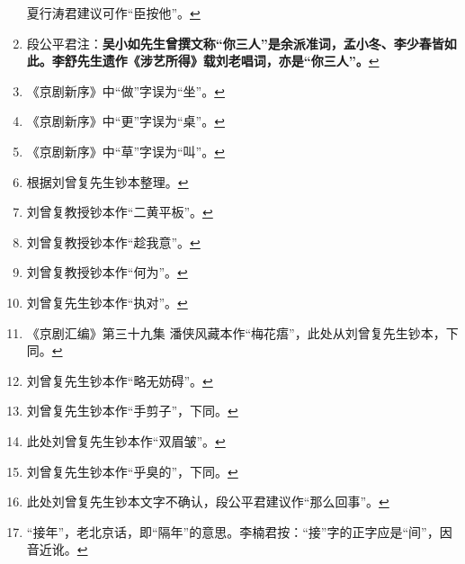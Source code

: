 \begin{enumerate}
  \leavevmode\hypertarget{fn565}{}%
  夏行涛君建议可作``臣按他''。\protect\hyperlink{fnref565}{↩}
\item
  \leavevmode\hypertarget{fn566}{}%
  段公平君注：\textbf{吴小如先生曾撰文称``你三人''是余派准词，孟小冬、李少春皆如此。李舒先生遗作《涉艺所得》载刘老唱词，亦是``你三人''。}\protect\hyperlink{fnref566}{↩}
\item
  \leavevmode\hypertarget{fn567}{}%
  《京剧新序》中``做''字误为``坐''。\protect\hyperlink{fnref567}{↩}
\item
  \leavevmode\hypertarget{fn568}{}%
  《京剧新序》中``更''字误为``桌''。\protect\hyperlink{fnref568}{↩}
\item
  \leavevmode\hypertarget{fn569}{}%
  《京剧新序》中``草''字误为``叫''。\protect\hyperlink{fnref569}{↩}
\item
  \leavevmode\hypertarget{fn570}{}%
  根据刘曾复先生钞本整理。\protect\hyperlink{fnref570}{↩}
\item
  \leavevmode\hypertarget{fn571}{}%
  刘曾复教授钞本作``二黄平板''。\protect\hyperlink{fnref571}{↩}
\item
  \leavevmode\hypertarget{fn572}{}%
  刘曾复教授钞本作``趁我意''。\protect\hyperlink{fnref572}{↩}
\item
  \leavevmode\hypertarget{fn573}{}%
  刘曾复教授钞本作``何为''。\protect\hyperlink{fnref573}{↩}
\item
  \leavevmode\hypertarget{fn574}{}%
  刘曾复先生钞本作``执对''。\protect\hyperlink{fnref574}{↩}
\item
  \leavevmode\hypertarget{fn575}{}%
  《京剧汇编》第三十九集
  潘侠风藏本作``梅花痦''，此处从刘曾复先生钞本，下同。\protect\hyperlink{fnref575}{↩}
\item
  \leavevmode\hypertarget{fn576}{}%
  刘曾复先生钞本作``略无妨碍''。\protect\hyperlink{fnref576}{↩}
\item
  \leavevmode\hypertarget{fn577}{}%
  刘曾复先生钞本作``手剪子''，下同。\protect\hyperlink{fnref577}{↩}
\item
  \leavevmode\hypertarget{fn578}{}%
  此处刘曾复先生钞本作``双眉皱''。\protect\hyperlink{fnref578}{↩}
\item
  \leavevmode\hypertarget{fn579}{}%
  刘曾复先生钞本作``乎臭的''，下同。\protect\hyperlink{fnref579}{↩}
\item
  \leavevmode\hypertarget{fn580}{}%
  此处刘曾复先生钞本文字不确认，段公平君建议作``那么回事''。\protect\hyperlink{fnref580}{↩}
\item
  \leavevmode\hypertarget{fn581}{}%
  ``接年''，老北京话，即``隔年''的意思。李楠君按：``接''字的正字应是``间''，因音近讹。\protect\hyperlink{fnref581}{↩}

\end{enumerate}
